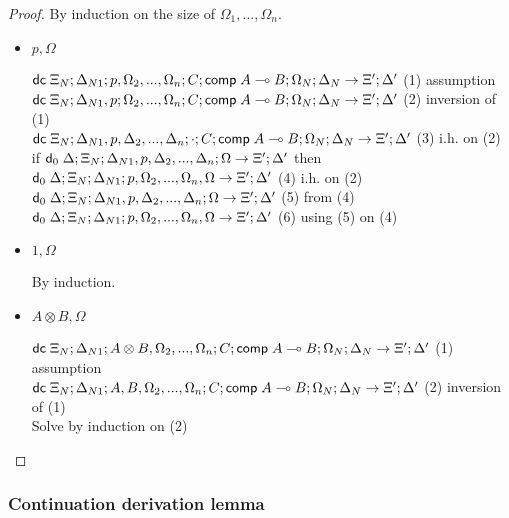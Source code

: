 \begin{proof}
   By induction on the size of $\Omega_1, ..., \Omega_n$.
   
   \begin{itemize}
      \item $p, \Omega$
      
      $\mathsf{dc} \; \Xi_N; \Delta_{N1}; p, \Omega_2, ..., \Omega_n; C; \mathsf{comp} \; A \multimap B; \Omega_N; \Delta_N \rightarrow \Xi'; \Delta'$ \hfill (1) assumption \\
      $\mathsf{dc} \; \Xi_N; \Delta_{N1}, p; \Omega_2, ..., \Omega_n; C; \mathsf{comp} \; A \multimap B; \Omega_N; \Delta_N \rightarrow \Xi'; \Delta'$ \hfill (2) inversion of (1) \\
      $\mathsf{dc} \; \Xi_N; \Delta_{N1}, p, \Delta_2, ..., \Delta_n; \cdot; C; \mathsf{comp} \; A \multimap B; \Omega_N; \Delta_N \rightarrow \Xi'; \Delta'$ \hfill (3) i.h. on (2) \\
      if $\mathsf{d}_0 \; \Delta; \Xi_N; \Delta_{N1}, p, \Delta_2, ..., \Delta_n; \Omega \rightarrow \Xi'; \Delta'$ then $\mathsf{d}_0 \; \Delta; \Xi_N; \Delta_{N1}; p, \Omega_2, ..., \Omega_n, \Omega \rightarrow \Xi'; \Delta'$ \hfill (4) i.h. on (2) \\
      $\mathsf{d}_0 \; \Delta; \Xi_N; \Delta_{N1}, p, \Delta_2, ..., \Delta_n; \Omega \rightarrow \Xi'; \Delta'$ \hfill (5) from (4) \\
      $\mathsf{d}_0 \; \Delta; \Xi_N; \Delta_{N1}; p, \Omega_2, ..., \Omega_n, \Omega \rightarrow \Xi'; \Delta'$ \hfill (6) using (5) on (4) \\
      
      \item $1, \Omega$
      
      By induction.
      
      \item $A \otimes B, \Omega$
      
      $\mathsf{dc} \; \Xi_N; \Delta_{N1}; A \otimes B, \Omega_2, ..., \Omega_n; C; \mathsf{comp} \; A \multimap B; \Omega_N; \Delta_N \rightarrow \Xi'; \Delta'$ \hfill (1) assumption \\
      $\mathsf{dc} \; \Xi_N; \Delta_{N1}; A, B, \Omega_2, ..., \Omega_n; C; \mathsf{comp} \; A \multimap B; \Omega_N; \Delta_N \rightarrow \Xi'; \Delta'$ \hfill (2) inversion of (1) \\
      Solve by induction on (2) \\
   \end{itemize}
\end{proof}

\subsubsection{Continuation derivation lemma}

